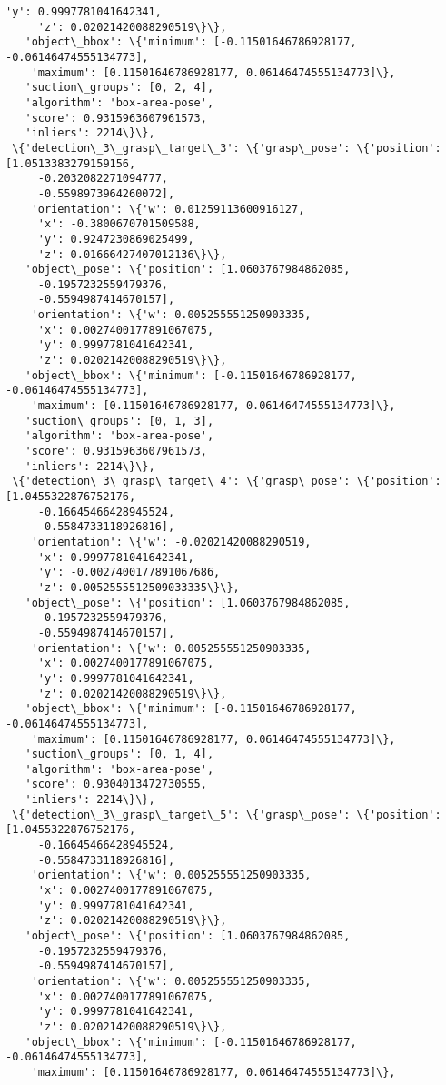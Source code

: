 \documentclass[11pt]{article}
\begin{document}
\begin{tcolorbox}[breakable, size=fbox, boxrule=.5pt, pad at break*=1mm, opacityfill=0]
\begin{Verbatim}[commandchars=\\\{\}]
     'y': 0.9997781041642341,
     'z': 0.02021420088290519\}\},
   'object\_bbox': \{'minimum': [-0.11501646786928177, -0.06146474555134773],
    'maximum': [0.11501646786928177, 0.06146474555134773]\},
   'suction\_groups': [0, 2, 4],
   'algorithm': 'box-area-pose',
   'score': 0.9315963607961573,
   'inliers': 2214\}\},
 \{'detection\_3\_grasp\_target\_3': \{'grasp\_pose': \{'position': [1.0513383279159156,
     -0.2032082271094777,
     -0.5598973964260072],
    'orientation': \{'w': 0.01259113600916127,
     'x': -0.3800670701509588,
     'y': 0.9247230869025499,
     'z': 0.01666427407012136\}\},
   'object\_pose': \{'position': [1.0603767984862085,
     -0.1957232559479376,
     -0.5594987414670157],
    'orientation': \{'w': 0.005255551250903335,
     'x': 0.0027400177891067075,
     'y': 0.9997781041642341,
     'z': 0.02021420088290519\}\},
   'object\_bbox': \{'minimum': [-0.11501646786928177, -0.06146474555134773],
    'maximum': [0.11501646786928177, 0.06146474555134773]\},
   'suction\_groups': [0, 1, 3],
   'algorithm': 'box-area-pose',
   'score': 0.9315963607961573,
   'inliers': 2214\}\},
 \{'detection\_3\_grasp\_target\_4': \{'grasp\_pose': \{'position': [1.0455322876752176,
     -0.16645466428945524,
     -0.5584733118926816],
    'orientation': \{'w': -0.02021420088290519,
     'x': 0.9997781041642341,
     'y': -0.0027400177891067686,
     'z': 0.0052555512509033335\}\},
   'object\_pose': \{'position': [1.0603767984862085,
     -0.1957232559479376,
     -0.5594987414670157],
    'orientation': \{'w': 0.005255551250903335,
     'x': 0.0027400177891067075,
     'y': 0.9997781041642341,
     'z': 0.02021420088290519\}\},
   'object\_bbox': \{'minimum': [-0.11501646786928177, -0.06146474555134773],
    'maximum': [0.11501646786928177, 0.06146474555134773]\},
   'suction\_groups': [0, 1, 4],
   'algorithm': 'box-area-pose',
   'score': 0.9304013472730555,
   'inliers': 2214\}\},
 \{'detection\_3\_grasp\_target\_5': \{'grasp\_pose': \{'position': [1.0455322876752176,
     -0.16645466428945524,
     -0.5584733118926816],
    'orientation': \{'w': 0.005255551250903335,
     'x': 0.0027400177891067075,
     'y': 0.9997781041642341,
     'z': 0.02021420088290519\}\},
   'object\_pose': \{'position': [1.0603767984862085,
     -0.1957232559479376,
     -0.5594987414670157],
    'orientation': \{'w': 0.005255551250903335,
     'x': 0.0027400177891067075,
     'y': 0.9997781041642341,
     'z': 0.02021420088290519\}\},
   'object\_bbox': \{'minimum': [-0.11501646786928177, -0.06146474555134773],
    'maximum': [0.11501646786928177, 0.06146474555134773]\},

\end{Verbatim}
\end{tcolorbox}
\end{document}
